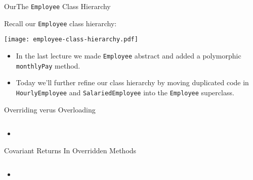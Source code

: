 \documentclass{beamer}
\author[Chris Simpkins] 
{Christopher Simpkins \\\texttt{chris.simpkins@gatech.edu}}
\institute[Georgia Tech] %
\date[CS 1331]{}
\begin{document}
\begin{frame}
  \titlepage
\end{frame}


\begin{frame}[fragile]{OurThe {\tt Employee} Class Hierarchy}


Recall our {\tt Employee} class hierarchy:
\vspace{-.1in}
\begin{center}
\texttt{[image: employee-class-hierarchy.pdf]}
\end{center}
\begin{itemize}
\item In the last lecture we made {\tt Employee} abstract and added a polymorphic {\tt monthlyPay} method.
\item Today we'll further refine our class hierarchy by moving duplicated code in {\tt HourlyEmployee} and {\tt SalariedEmployee} into the {\tt Employee} superclass.
\end{itemize}
\end{frame}


\begin{frame}[fragile]{Overriding verus Overloading}


\begin{lstlisting}[language=Java]

\end{lstlisting}

\begin{itemize}
\item
\end{itemize}


\end{frame}

\begin{frame}[fragile]{Covariant Returns In Overridden Methods}


\begin{lstlisting}[language=Java]

\end{lstlisting}

\begin{itemize}
\item
\end{itemize}


\end{frame}
\end{document}

